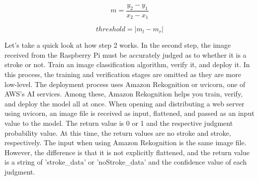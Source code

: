 \begin{equation} 
	m = \frac{y_2-y_1}{x_2-x_1}
\end{equation}

\begin{equation}
    threshold = |m_l - m_r|
\end{equation}




Let’s take a quick look at how step 2 works. In the second step, the image received from the Raspberry Pi must be accurately judged as to whether it is a stroke or not. Train an image classification algorithm, verify it, and deploy it. In this process, the training and verification stages are omitted as they are more low-level. The deployment process uses Amazon Rekognition or uvicorn, one of AWS's AI services. Among these, Amazon Rekognition helps you train, verify, and deploy the model all at once.
When opening and distributing a web server using uvicorn, an image file is received as input, flattened, and passed as an input value to the model. The return value is 0 or 1 and the respective judgment probability value. At this time, the return values are no stroke and stroke, respectively. The input when using Amazon Rekognition is the same image file. However, the difference is that it is not explicitly flattened, and the return value is a string of 'stroke\_data' or 'noStroke\_data' and the confidence value of each judgment.\\

